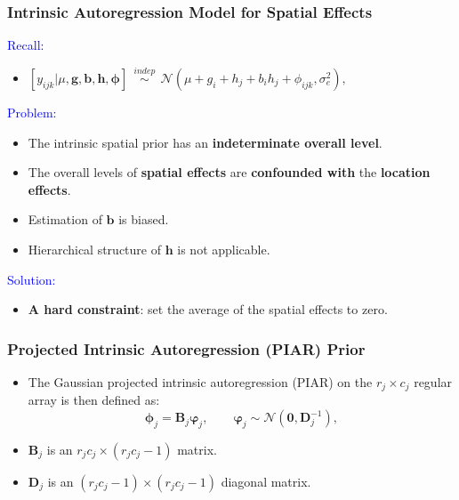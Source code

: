 \documentclass{beamer}
\newcommand{\bB}{\mathbf{B}}
\newcommand{\bD}{\mathbf{D}}
\newcommand{\bphi}{{\bm\phi}}
\newcommand{\bvarphi}{{\bm\varphi}}
\begin{document}
\begin{frame}
	\frametitle{Intrinsic Autoregression Model for Spatial Effects}

\textcolor{blue}{Recall: } 
\begin{itemize}
\item $[y_{ijk} | \mu, \mathbf{g}, \mathbf{b}, \mathbf{h}, \bphi ] \ \ \overset{indep}{\sim} \ \  \mathcal{N}(\mu + g_i + h_j + b_i h_j + \phi_{ijk}, \sigma_e^2), $
\end{itemize}

\pause
	
\textcolor{blue}{Problem: }
\begin{itemize}
\item The intrinsic spatial prior has an \textbf{indeterminate overall level}.
\item The overall levels of \textbf{spatial effects} are \textbf{confounded with} the \textbf{location effects}.
\item Estimation of $\mathbf{b}$ is biased.
\item Hierarchical structure of $\mathbf{h}$ is not applicable.
\end{itemize}

\pause
\textcolor{blue}{Solution: }
	\begin{itemize}
\item  \textbf{A hard constraint}:  set the average of the spatial effects to zero.
\end{itemize}
 
\end{frame}




\begin{frame}
	\frametitle{Projected Intrinsic Autoregression (PIAR) Prior}

  	\begin{itemize}
	\item The Gaussian projected intrinsic autoregression (PIAR) on the $r_j \times c_j$ regular array is then defined as:
	\begin{equation*}
\bphi_j = \bB_j \bvarphi_j,\qquad \bvarphi_j\sim{\mathcal N}(\mathbf{0},\bD_j^{-1}),
\end{equation*}
\item  $\bB_{j}$ is an $r_jc_j \times (r_jc_j-1)$ matrix.
\item $\bD_j$ is an $(r_jc_j-1) \times (r_jc_j-1)$ diagonal matrix. 
	\end{itemize}
	
\end{frame}
\end{document}

